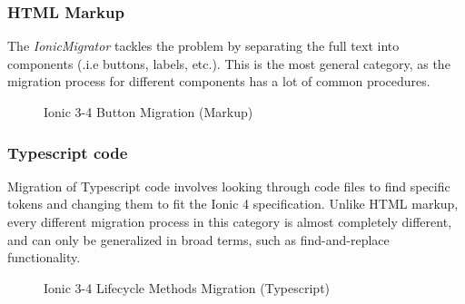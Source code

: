 \documentclass[conference]{IEEEtran}
\begin{document}
\subsubsection{HTML Markup}
The \textit{IonicMigrator} tackles the problem by separating the full
text into components (.i.e buttons, labels, etc.). This is the most
general category, as the migration process for different components
has a lot of common procedures.
\begin{figure}[!htb]
    \centering
    \qquad
    \caption{Ionic 3-4 Button Migration (Markup)}
    \label{fig:ionicButtonMigration}
\end{figure}

\subsubsection{Typescript code}
Migration of Typescript code involves looking through code files
to find specific tokens and changing them to fit the Ionic 4 specification.
Unlike HTML markup, every different migration process in this category is almost
completely different, and can only be generalized in broad terms, such as find-and-replace
functionality.
\begin{figure}[!htb]
    \centering
    \qquad
    \caption{Ionic 3-4 Lifecycle Methods Migration (Typescript)}
    \label{fig:ionicLifecycleMigration}
\end{figure}
\end{document}
